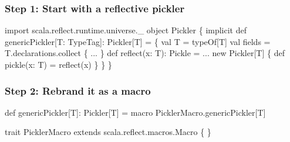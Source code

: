 \documentclass[svgnames,hyperref={bookmarks=false}]{beamer}
\begin{document}
\begin{frame}[t, fragile]
\frametitle{Step 1: Start with a reflective pickler}

\begin{semiverbatim}


import scala.reflect.runtime.universe.\_
object Pickler \{
  implicit def genericPickler[T: TypeTag]: Pickler[T] = \{
    val T = typeOf[T]
    val fields = T.declarations.collect \{ ... \}
    def reflect(x: T): Pickle = ...
    new Pickler[T] \{ def pickle(x: T) = reflect(x) \}
  \}
\}
\end{semiverbatim}
\end{frame}

\begin{frame}[t, fragile]
\frametitle{Step 2: Rebrand it as a macro}

\begin{semiverbatim}
\alert{def genericPickler[T]: Pickler[T] =
  macro PicklerMacro.genericPickler[T]}

\alert{trait PicklerMacro extends scala.reflect.macros.Macro} \{
    \text{\color{black}{val T = typeOf[T]}}
    \text{\color{black}{def reflect(x: T): Pickle = ...}}
  \text{\color{black}{\}}}
\}
\end{semiverbatim}
\end{frame}



\end{document}
